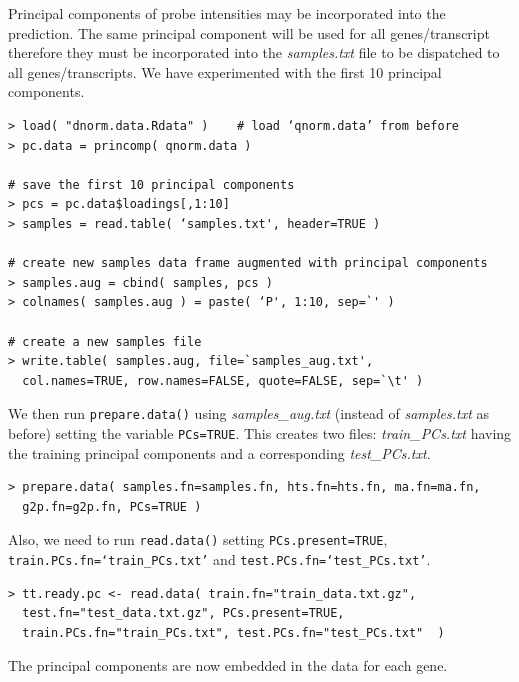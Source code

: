 \documentclass[a4paper,12pt]{article}
\begin{document}
Principal components of probe intensities may be incorporated into the prediction. The same principal component will be used for all genes/transcript therefore they must be incorporated into the \textit{samples.txt} file to be dispatched to all genes/transcripts. We have experimented with the first 10 principal components. 

\begin{verbatim}
> load( "dnorm.data.Rdata" )	# load ‘qnorm.data’ from before
> pc.data = princomp( qnorm.data )

# save the first 10 principal components
> pcs = pc.data$loadings[,1:10]
> samples = read.table( ‘samples.txt', header=TRUE )

# create new samples data frame augmented with principal components
> samples.aug = cbind( samples, pcs )
> colnames( samples.aug ) = paste( ‘P', 1:10, sep=`' )

# create a new samples file
> write.table( samples.aug, file=`samples_aug.txt', 
  col.names=TRUE, row.names=FALSE, quote=FALSE, sep=`\t' )
\end{verbatim}

We then run \texttt{prepare.data()} using \textit{samples\_aug.txt} (instead of \textit{samples.txt} as before) setting the variable \texttt{PCs=TRUE}. This creates two files: \textit{train\_PCs.txt} having the training principal components and a corresponding \textit{test\_PCs.txt}.

\begin{verbatim}
> prepare.data( samples.fn=samples.fn, hts.fn=hts.fn, ma.fn=ma.fn, 
  g2p.fn=g2p.fn, PCs=TRUE )
\end{verbatim} 

Also, we need to run \texttt{read.data()} setting \texttt{PCs.present=TRUE},\\ \texttt{train.PCs.fn=`train\_PCs.txt'} and \texttt{test.PCs.fn=`test\_PCs.txt'}.

\begin{verbatim}
> tt.ready.pc <- read.data( train.fn="train_data.txt.gz", 
  test.fn="test_data.txt.gz", PCs.present=TRUE, 
  train.PCs.fn="train_PCs.txt", test.PCs.fn="test_PCs.txt"  )
\end{verbatim} 

The principal components are now embedded in the data for each gene.
\end{document}
